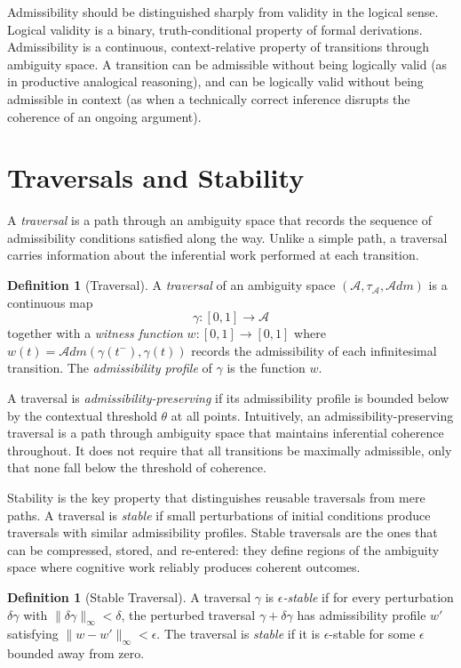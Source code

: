 \documentclass[12pt,oneside]{book}
\theoremstyle{plain}
\theoremstyle{definition}
\newtheorem{definition}[theorem]{Definition}
\theoremstyle{plain}
\newcommand{\cA}{\mathcal{A}}
\begin{document}
Admissibility should be distinguished sharply from validity in the logical sense. Logical validity is a binary, truth-conditional property of formal derivations. Admissibility is a continuous, context-relative property of transitions through ambiguity space. A transition can be admissible without being logically valid (as in productive analogical reasoning), and can be logically valid without being admissible in context (as when a technically correct inference disrupts the coherence of an ongoing argument).

\section{Traversals and Stability}

A \emph{traversal} is a path through an ambiguity space that records the sequence of admissibility conditions satisfied along the way. Unlike a simple path, a traversal carries information about the inferential work performed at each transition.

\begin{definition}[Traversal]
A \emph{traversal} of an ambiguity space $(\cA, \tau_\cA, \mathcal{A}dm)$ is a continuous map
\[
\gamma : [0,1] \to \cA
\]
together with a \emph{witness function} $w : [0,1] \to [0,1]$ where $w(t) = \mathcal{A}dm(\gamma(t^-), \gamma(t))$ records the admissibility of each infinitesimal transition. The \emph{admissibility profile} of $\gamma$ is the function $w$.
\end{definition}

A traversal is \emph{admissibility-preserving} if its admissibility profile is bounded below by the contextual threshold $\theta$ at all points. Intuitively, an admissibility-preserving traversal is a path through ambiguity space that maintains inferential coherence throughout. It does not require that all transitions be maximally admissible, only that none fall below the threshold of coherence.

Stability is the key property that distinguishes reusable traversals from mere paths. A traversal is \emph{stable} if small perturbations of initial conditions produce traversals with similar admissibility profiles. Stable traversals are the ones that can be compressed, stored, and re-entered: they define regions of the ambiguity space where cognitive work reliably produces coherent outcomes.

\begin{definition}[Stable Traversal]
A traversal $\gamma$ is \emph{$\epsilon$-stable} if for every perturbation $\delta\gamma$ with $\|\delta\gamma\|_\infty < \delta$, the perturbed traversal $\gamma + \delta\gamma$ has admissibility profile $w'$ satisfying $\|w - w'\|_\infty < \epsilon$. The traversal is \emph{stable} if it is $\epsilon$-stable for some $\epsilon$ bounded away from zero.
\end{definition}
\end{document}
